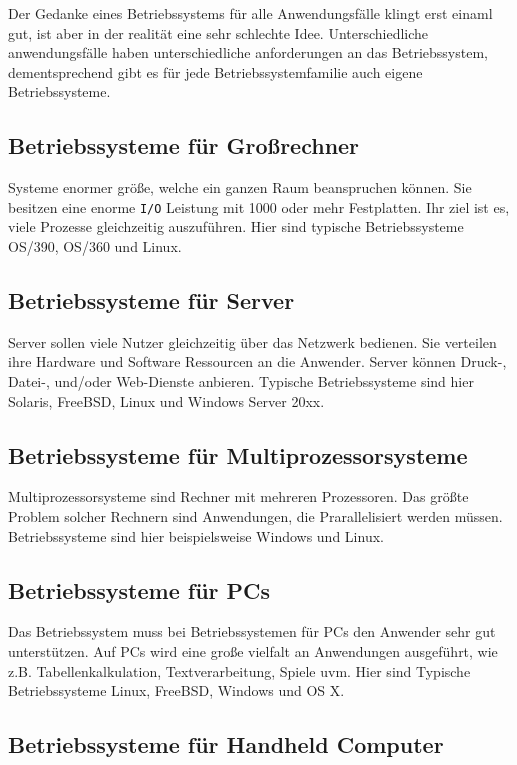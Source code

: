 Der Gedanke eines Betriebssystems für alle Anwendungsfälle klingt erst einaml gut, ist aber in der realität eine sehr schlechte Idee. Unterschiedliche anwendungsfälle haben unterschiedliche anforderungen an das Betriebssystem, dementsprechend gibt es für jede Betriebssystemfamilie auch eigene Betriebssysteme.

\subsection{Betriebssysteme für Großrechner}

Systeme enormer größe, welche ein ganzen Raum beanspruchen können. Sie besitzen eine enorme \texttt{I/O} Leistung mit 1000 oder mehr Festplatten. Ihr ziel ist es, viele Prozesse gleichzeitig auszuführen. Hier sind typische Betriebssysteme OS/390, OS/360 und Linux.

\subsection{Betriebssysteme für Server}

Server sollen viele Nutzer gleichzeitig über das Netzwerk bedienen. Sie verteilen ihre Hardware und Software Ressourcen an die Anwender. Server können Druck-, Datei-, und/oder Web-Dienste anbieren. Typische Betriebssysteme sind hier Solaris, FreeBSD, Linux und Windows Server 20xx.

\subsection{Betriebssysteme für Multiprozessorsysteme}

Multiprozessorsysteme sind Rechner mit mehreren Prozessoren. Das größte Problem solcher Rechnern sind Anwendungen, die Prarallelisiert werden müssen. Betriebssysteme sind hier beispielsweise Windows und Linux.

\subsection{Betriebssysteme für PCs}

Das Betriebssystem muss bei Betriebssystemen für PCs den Anwender sehr gut unterstützen. Auf PCs wird eine große vielfalt an Anwendungen ausgeführt, wie z.B. Tabellenkalkulation, Textverarbeitung, Spiele uvm. Hier sind Typische Betriebssysteme Linux, FreeBSD, Windows und OS X.

\subsection{Betriebssysteme für Handheld Computer}

